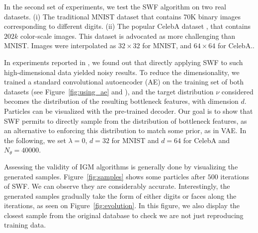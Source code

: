 In the second set of experiments, we test the SWF algorithm on two real datasets. (i) The traditional MNIST dataset that contains 70K binary images corresponding to different digits. (ii) The popular CelebA dataset \cite{liu2015faceattributes}, that contains $202k$ color-scale images. This dataset is advocated as more challenging than MNIST. Images were interpolated as $32\times 32$ for MNIST, and $64\times 64$ for CelebA..

In experiments reported in \supp, we found out that directly applying SWF to such high-dimensional data yielded noisy results. To reduce the dimensionality, we trained a standard convolutional autoencoder (AE) on the training set of both datasets (see Figure~\ref{fig:using_ae} and \supp), and the target distribution $\nu$ considered becomes the distribution of the resulting bottleneck features,
with dimension $d$. Particles can be visualized with the pre-trained decoder.
Our goal is to show that SWF permits to directly sample from the distribution of bottleneck features, as an alternative to enforcing this distribution to match some prior, as in VAE. In the following, we set $\lambda=0$, $d=32$ for MNIST and $d=64$ for CelebA  and $N_\theta=40000$.


Assessing the validity of IGM algorithms is generally done by visualizing the generated samples. Figure~\ref{fig:samples} shows some particles after $500$ iterations of SWF. We can observe they are considerably accurate. Interestingly, the generated samples gradually take the form of either digits or faces along the iterations, as seen on Figure~\ref{fig:evolution}. In this figure, we also display the closest sample from the original database to check we are not just reproducing training data.

